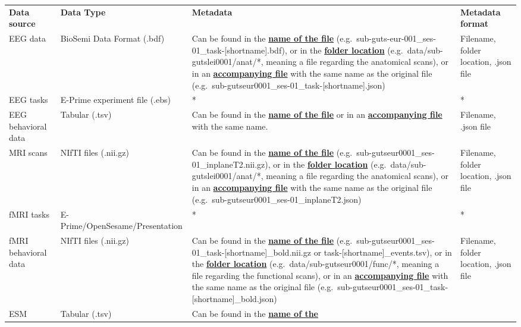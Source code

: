 \documentclass[
  letterpaper,
  DIV=11,
  numbers=noendperiod]{scrreprt}
\begin{document}
\label{metadata-table}
\begin{longtable}[]{@{}
  >{\raggedright\arraybackslash}p{}
  >{\raggedright\arraybackslash}p{}
  >{\raggedright\arraybackslash}p{}
  >{\raggedright\arraybackslash}p{}@{}}
\toprule\noalign{}
\endhead
\bottomrule\noalign{}
\endlastfoot
\textbf{Data source} & \textbf{Data Type} & \textbf{Metadata} &
\textbf{Metadata format} \\
EEG data & BioSemi Data Format (.bdf) & Can be found in the
\ul{\textbf{name of the file}}
(e.g.~sub-guts-eur-001\_ses-01\_task-{[}shortname{]}.bdf), or in the
\ul{\textbf{folder location}} (e.g.~data/sub-gutslei0001/anat/*, meaning
a file regarding the anatomical scans), or in an
\ul{\textbf{accompanying file}} with the same name as the original file
(e.g.~sub-gutseur0001\_ses-01\_task-{[}shortname{]}.json) & Filename,
folder location, .json file \\
EEG tasks & E-Prime experiment file (.ebs) & * & * \\
EEG behavioral data & Tabular (.tsv) & Can be found in the
\ul{\textbf{name of the file}} or in an \ul{\textbf{accompanying file}}
with the same name. & Filename, .json file \\
MRI scans & NIfTI files (.nii.gz) & Can be found in the \ul{\textbf{name
of the file}} (e.g.~sub-gutseur0001\_ses-01\_inplaneT2.nii.gz), or in
the \ul{\textbf{folder location}} (e.g.~data/sub-gutslei0001/anat/*,
meaning a file regarding the anatomical scans), or in an
\ul{\textbf{accompanying file}} with the same name as the original file
(e.g.~sub-gutseur0001\_ses-01\_inplaneT2.json) & Filename, folder
location, .json file \\
fMRI tasks & E-Prime/OpenSesame/Presentation & * & * \\
fMRI behavioral data & NIfTI files (.nii.gz) & Can be found in the
\ul{\textbf{name of the file}}
(e.g.~sub-gutseur0001\_ses-01\_task-{[}shortname{]}\_bold.nii.gz or
task-{[}shortname{]}\_events.tsv), or in the \ul{\textbf{folder
location}} (e.g.~data/sub-gutseur0001/func/*, meaning a file regarding
the functional scans), or in an \ul{\textbf{accompanying file}} with the
same name as the original file
(e.g.~sub-gutseur0001\_ses-01\_task-{[}shortname{]}\_bold.json) &
Filename, folder location, .json file \\
ESM & Tabular (.tsv) & Can be found in the \ul{\textbf{name of the
}}
\end{longtable}
\end{document}
